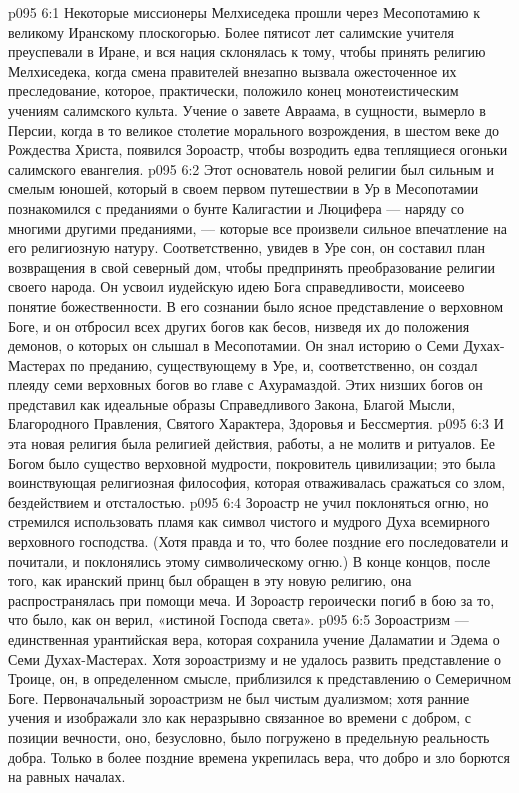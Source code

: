 \vs p095 6:1 Некоторые миссионеры Мелхиседека прошли через Месопотамию к великому Иранскому плоскогорью. Более пятисот лет салимские учителя преуспевали в Иране, и вся нация склонялась к тому, чтобы принять религию Мелхиседека, когда смена правителей внезапно вызвала ожесточенное их преследование, которое, практически, положило конец монотеистическим учениям салимского культа. Учение о завете Авраама, в сущности, вымерло в Персии, когда в то великое столетие морального возрождения, в шестом веке до Рождества Христа, появился Зороастр, чтобы возродить едва теплящиеся огоньки салимского евангелия.
\vs p095 6:2 Этот основатель новой религии был сильным и смелым юношей, который в своем первом путешествии в Ур в Месопотамии познакомился с преданиями о бунте Калигастии и Люцифера --- наряду со многими другими преданиями, --- которые все произвели сильное впечатление на его религиозную натуру. Соответственно, увидев в Уре сон, он составил план возвращения в свой северный дом, чтобы предпринять преобразование религии своего народа. Он усвоил иудейскую идею Бога справедливости, моисеево понятие божественности. В его сознании было ясное представление о верховном Боге, и он отбросил всех других богов как бесов, низведя их до положения демонов, о которых он слышал в Месопотамии. Он знал историю о Семи Духах\hyp{}Мастерах по преданию, существующему в Уре, и, соответственно, он создал плеяду семи верховных богов во главе с Ахурамаздой. Этих низших богов он представил как идеальные образы Справедливого Закона, Благой Мысли, Благородного Правления, Святого Характера, Здоровья и Бессмертия.
\vs p095 6:3 И эта новая религия была религией действия, работы, а не молитв и ритуалов. Ее Богом было существо верховной мудрости, покровитель цивилизации; это была воинствующая религиозная философия, которая отваживалась сражаться со злом, бездействием и отсталостью.
\vs p095 6:4 Зороастр не учил поклоняться огню, но стремился использовать пламя как символ чистого и мудрого Духа всемирного верховного господства. (Хотя правда и то, что более поздние его последователи и почитали, и поклонялись этому символическому огню.) В конце концов, после того, как иранский принц был обращен в эту новую религию, она распространялась при помощи меча. И Зороастр героически погиб в бою за то, что было, как он верил, «истиной Господа света».
\vs p095 6:5 \pc Зороастризм --- единственная урантийская вера, которая сохранила учение Даламатии и Эдема о Семи Духах\hyp{}Мастерах. Хотя зороастризму и не удалось развить представление о Троице, он, в определенном смысле, приблизился к представлению о Семеричном Боге. Первоначальный зороастризм не был чистым дуализмом; хотя ранние учения и изображали зло как неразрывно связанное во времени с добром, с позиции вечности, оно, безусловно, было погружено в предельную реальность добра. Только в более поздние времена укрепилась вера, что добро и зло борются на равных началах.
